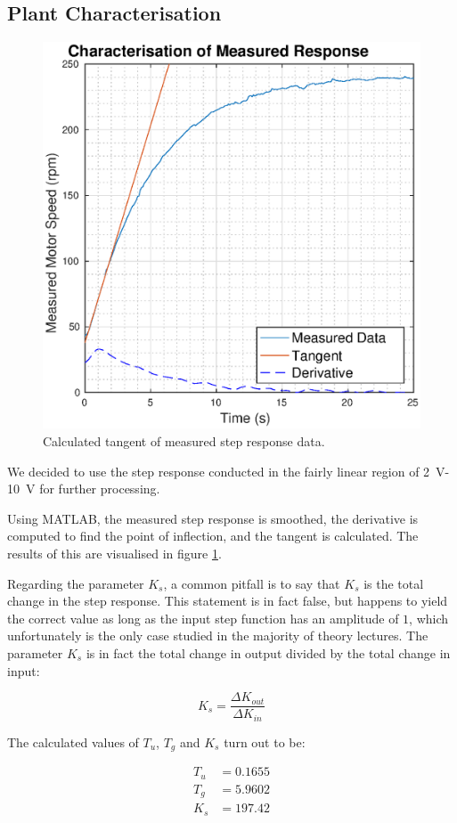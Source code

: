 \subsection{Plant Characterisation}
\label{sec:sim:characterisation}

\begin{figure}[b!]
    \centering
    \includegraphics[width=\imagewidth]{images/characterisation}
    \caption{Calculated tangent of measured step response data.}
    \label{fig:characterisation}
\end{figure}

We decided  to  use the step response conducted in the fairly linear region of
\SI{2}{\volt}-\SI{10}{\volt} for further processing.

Using  MATLAB, the measured step  response  is  smoothed,  the  derivative  is
computed  to find the point of inflection, and the tangent is calculated.  The
results   of  this  are  visualised  in   figure   \ref{fig:characterisation}.

Regarding the parameter $K_s$, a common pitfall is to  say  that  $K_s$ is the
total  change in the step response. This  statement  is  in  fact  false,  but
happens to yield the correct value as long as the input step  function  has an
amplitude of $1$, which unfortunately is the only case studied in the majority
of theory lectures. The parameter $K_s$ is in fact the total change in  output
divided by the total change in input:

\begin{equation}
    K_s = \frac{\Delta K_{out}}{\Delta K_{in}}
\end{equation}

The calculated values of $T_u$, $T_g$ and $K_s$ turn out to be:

\begin{align*}
    T_u &= 0.1655 \\
    T_g &= 5.9602 \\
    K_s &= 197.42
\end{align*}

